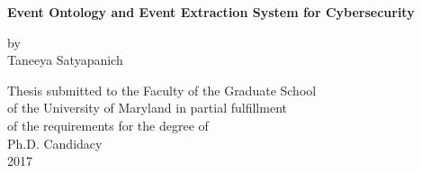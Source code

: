 \begin{titlepage}
\mbox{}\vspace{1in}
\begin{center}

    {\Large \bf Event Ontology and Event Extraction System for Cybersecurity \par}
    
\vspace{2in}

    {\large by} \\
    {\large Taneeya Satyapanich}
    
\vspace{2in}

  \begin{singlespace}
    Thesis submitted to the Faculty of the Graduate School \\
    of the University of Maryland in partial fulfillment \\
    of the requirements for the degree of \\
    Ph.D. Candidacy \\
    2017
	\end{singlespace}
\end{center}
\end{titlepage}
